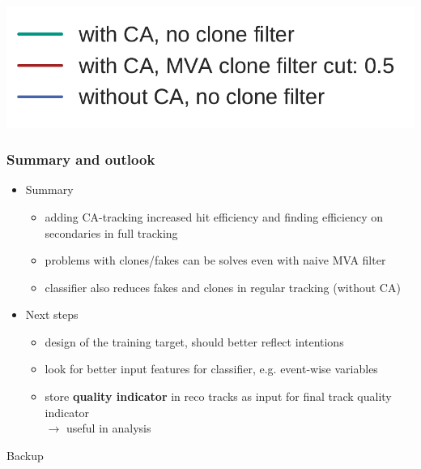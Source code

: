 \documentclass[18pt, aspectratio=169]{beamer}
\newcommand{\greenbold}[1]{\textcolor{kit-green100}{\bf{#1}}}
\begin{document}
\begin{frame}
\begin{columns}
\begin{column}{.5\textwidth}
    \end{column}
  \end{columns}
  \begin{center}
    \includegraphics[width=.2\textwidth]{figures/legend_fom_profile.pdf}
  \end{center}

\end{frame}

\begin{frame}
  \frametitle{Summary and outlook}
  \begin{itemize}
    \item Summary
      \begin{itemize}
      \item adding CA-tracking increased hit efficiency and finding efficiency on secondaries in
        full tracking
      \item problems with clones/fakes can be solves even with naive MVA filter
      \item classifier also reduces fakes and clones in regular tracking (without CA)
      \end{itemize}
    \item Next steps
      \begin{itemize}
      \item design of the training target, should better reflect intentions
      \item look for better input features for classifier, e.g. event-wise variables
      \item store \greenbold{quality indicator} in reco tracks as input for final track quality
        indicator\\
      $\rightarrow$ useful in analysis
      \end{itemize}
  \end{itemize}
\end{frame}

\appendix
\backupbegin
\begin{frame}
  \centering \huge
  Backup
\end{frame}
\end{document}
